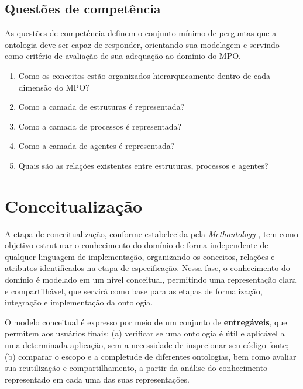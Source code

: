 \subsection{Questões de competência}
As questões de competência definem o conjunto mínimo de perguntas que a ontologia deve ser capaz de responder, orientando sua modelagem e servindo como critério de avaliação de sua adequação ao domínio do MPO.

\begin{enumerate}
    \item Como os conceitos estão organizados hierarquicamente dentro de cada dimensão do MPO?
    \item Como a camada de estruturas é representada?
    \item Como a camada de processos é representada?
    \item Como a camada de agentes é representada?
    \item Quais são as relações existentes entre estruturas, processos e agentes?
\end{enumerate}

\section{Conceitualização}
A etapa de conceitualização, conforme estabelecida pela \textit{Methontology} \cite{fernandez1997methontology}, tem como objetivo estruturar o conhecimento do domínio de forma independente de qualquer linguagem de implementação, organizando os conceitos, relações e atributos identificados na etapa de especificação. Nessa fase, o conhecimento do domínio é modelado em um nível conceitual, permitindo uma representação clara e compartilhável, que servirá como base para as etapas de formalização, integração e implementação da ontologia.

O modelo conceitual é expresso por meio de um conjunto de \textbf{entregáveis}, que permitem aos usuários finais:
(a) verificar se uma ontologia é útil e aplicável a uma determinada aplicação, sem a necessidade de inspecionar seu código-fonte;
(b) comparar o escopo e a completude de diferentes ontologias, bem como avaliar sua reutilização e compartilhamento, a partir da análise do conhecimento representado em cada uma das suas representações.

